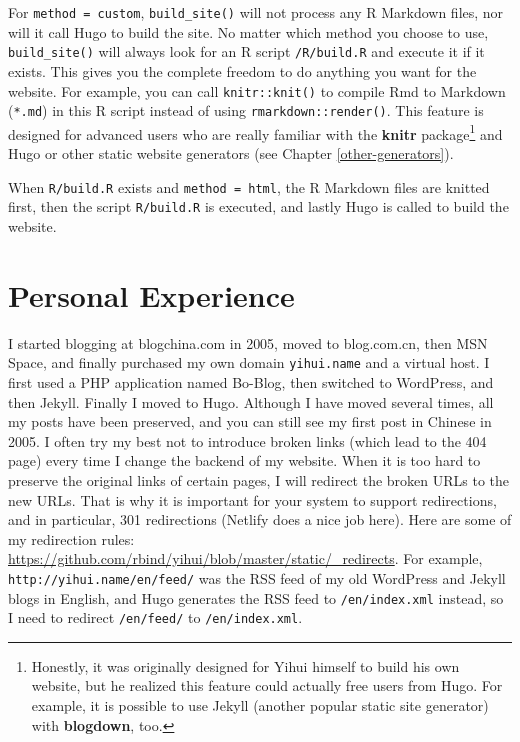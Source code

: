 \documentclass[12pt,]{krantz}
\theoremstyle{definition}
\theoremstyle{definition}
\theoremstyle{definition}
\theoremstyle{remark}
\begin{document}
For \texttt{method\ =\ \textquotesingle{}custom\textquotesingle{}},
\texttt{build\_site()} will not process any R Markdown files, nor will
it call Hugo to build the site. No matter which method you choose to
use, \texttt{build\_site()} will always look for an R script
\texttt{/R/build.R} and execute it if it exists. This gives you the
complete freedom to do anything you want for the website. For example,
you can call \texttt{knitr::knit()} to compile Rmd to Markdown
(\texttt{*.md}) in this R script instead of using
\texttt{rmarkdown::render()}. This feature is designed for advanced
users who are really familiar with the \textbf{knitr} package\footnote{Honestly,
  it was originally designed for Yihui himself to build his own website,
  but he realized this feature could actually free users from Hugo. For
  example, it is possible to use Jekyll (another popular static site
  generator) with \textbf{blogdown}, too.} and Hugo or other static
website generators (see Chapter \ref{other-generators}).

When \texttt{R/build.R} exists and
\texttt{method\ =\ \textquotesingle{}html\textquotesingle{}}, the R
Markdown files are knitted first, then the script \texttt{R/build.R} is
executed, and lastly Hugo is called to build the website.

\chapter{Personal Experience}\label{personal-experience}

I started blogging at blogchina.com in 2005, moved to blog.com.cn, then
MSN Space, and finally purchased my own domain \texttt{yihui.name} and a
virtual host. I first used a PHP application named Bo-Blog, then
switched to WordPress, and then Jekyll. Finally I moved to Hugo.
Although I have moved several times, all my posts have been preserved,
and you can still see my first post in Chinese in 2005. I often try my
best not to introduce broken links (which lead to the 404 page) every
time I change the backend of my website. When it is too hard to preserve
the original links of certain pages, I will redirect the broken URLs to
the new URLs. That is why it is important for your system to support
redirections, and in particular, 301 redirections (Netlify does a nice
job here). Here are some of my redirection rules:
\url{https://github.com/rbind/yihui/blob/master/static/_redirects}. For
example, \texttt{http://yihui.name/en/feed/} was the RSS feed of my old
WordPress and Jekyll blogs in English, and Hugo generates the RSS feed
to \texttt{/en/index.xml} instead, so I need to redirect
\texttt{/en/feed/} to \texttt{/en/index.xml}.
\end{document}
